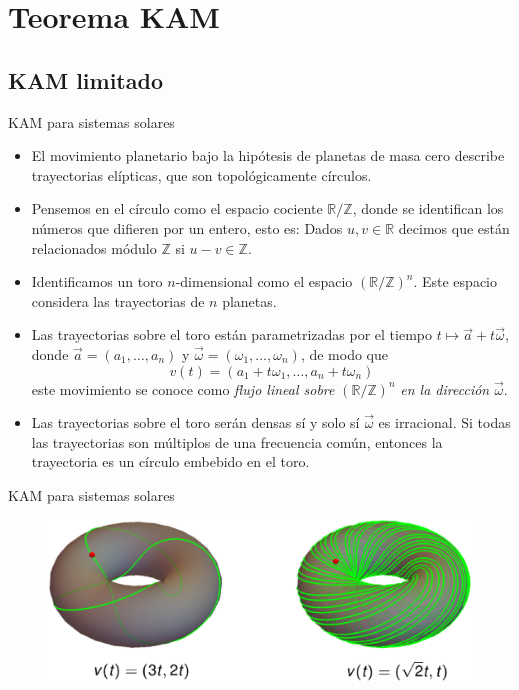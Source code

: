 \documentclass[8pt]{beamer}
\renewcommand{\>}{\rangle}
\newcommand{\<}{\langle}
\newcommand{\be}{\begin{equation}}
\newcommand{\ee}{\end{equation}}
\begin{document}
\section[Teorema KAM]{Teorema KAM}

\subsection[KAM limitado]{KAM limitado}

\begin{frame}{KAM para sistemas solares}
\vspace{-1.0cm}

\begin{itemize}
\item El movimiento planetario bajo la hipótesis de planetas de masa cero describe trayectorias elípticas, que son topológicamente círculos.
\item Pensemos en el círculo como el espacio cociente $\mathbb{R}/\mathbb{Z}$, donde se identifican los números que difieren por un entero, esto es: Dados $u, v \in \mathbb{R}$ decimos que están relacionados módulo $\mathbb{Z}$ si $u-v \in \mathbb{Z}$.
\item Identificamos un toro $n$-dimensional como el espacio $\left(\mathbb{R}/\mathbb{Z}\right)^{n}$. Este espacio considera las trayectorias de $n$ planetas.
\item Las trayectorias sobre el toro están parametrizadas por el tiempo $t \mapsto \vec{a} + t \vec{\omega}$, donde $\vec{a} = (a_{1}, \ldots, a_{n})$ y $\vec{\omega} = (\omega_{1},\ldots , \omega_{n})$, de modo que 
\be 
	v(t) = (a_{1} + t \omega_{1}, \ldots, a_{n} + t \omega_{n})
	\nonumber
\ee
este movimiento se conoce como {\it flujo lineal sobre} $\left(\mathbb{R}/\mathbb{Z}\right)^{n}$ {\it en la dirección} $\vec{\omega}$.
\item Las trayectorias sobre el toro serán densas sí y solo sí $\vec{\omega}$ es irracional. Si todas las trayectorias son múltiplos de una frecuencia común, entonces la trayectoria es un círculo embebido en el toro.
\end{itemize}

\end{frame}

\begin{frame}{KAM para sistemas solares}
\vspace{-0.0cm}

\begin{figure}[h]
\centering
\includegraphics[scale=0.35]{toros.eps}
\end{figure}

\end{frame}
\end{document}
